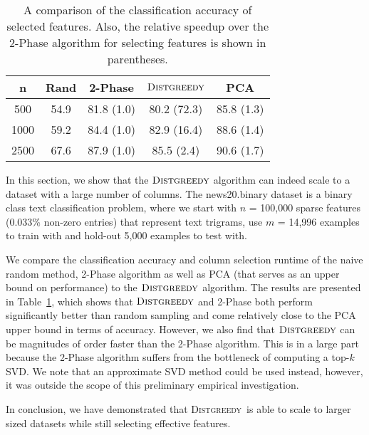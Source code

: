 \documentclass{article}
\newcommand{\distgreedy}{\textsc{Distgreedy}}
\begin{document}
\begin{table}
\begin{small}
\begin{center}
  \begin{tabular}{|c|c|c|c|c|}
    \hline
    \bf n & \bf Rand & \bf 2-Phase & \bf $\distgreedy$ &  \bf PCA \\
    \hline
\hline
    500 & 54.9 & 81.8 (1.0) & 80.2 (72.3) & 85.8 (1.3) \\
    \hline
    1000 & 59.2 & 84.4 (1.0) & 82.9 (16.4) & 88.6 (1.4)\\
    \hline
    2500 & 67.6 & 87.9 (1.0) & 85.5 (2.4) & 90.6 (1.7) \\
    \hline
\end{tabular}
\end{center}
\vspace{-0.1cm}
\end{small}
  \caption{A comparison of the classification accuracy of selected features. Also, the relative speedup over the 2-Phase algorithm for selecting features is shown in parentheses.
\vspace{-0.4cm}
  }
\label{table}
\end{table}

In this section, we show that the $\distgreedy$ algorithm can indeed
scale to a dataset with a large number of columns.
The news20.binary dataset is a binary class text classification
problem, where we start with $n$ = 100,000 sparse features (0.033\%
non-zero entries) that represent text trigrams, use $m$ = 14,996
examples to train with and hold-out 5,000 examples to test with.

We compare the classification accuracy and column selection runtime of
the naive random method, 2-Phase algorithm
as well as PCA (that serves as an upper bound on performance)
to the $\distgreedy$ algorithm.
The results are presented in Table~\ref{table}, which shows that
$\distgreedy$ and 2-Phase both perform significantly better than random sampling and
come relatively close to the PCA upper bound in terms of accuracy. However,
we also find that $\distgreedy$ can be magnitudes of order faster than the 2-Phase
algorithm. This is in a large part because the 2-Phase algorithm suffers from the bottleneck of
computing a top-$k$ SVD. We note that an approximate SVD method
could be used instead,
however, it was outside the scope of this preliminary empirical investigation.

In conclusion, we have demonstrated that \distgreedy\ is able to scale to
larger sized datasets while still selecting effective features.
\end{document}
